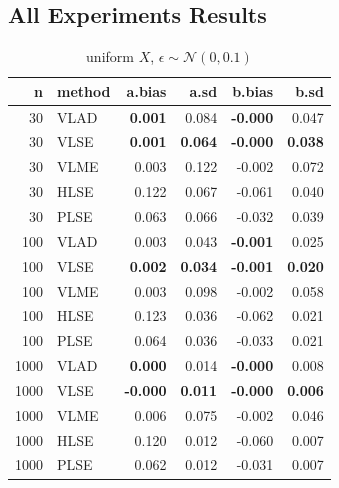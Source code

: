 \documentclass[twoside]{article}
\begin{document}
\subsection{All Experiments Results}
\label{append}

\begin{table}[ht]
\caption{uniform $X$, $\epsilon \sim \mathcal{N}(0,0.1)$}
\centering
\begin{tabular}{rlrrrr}
  \hline
  n & method & a.bias & a.sd & b.bias & b.sd \\ 
  \hline
  30 & VLAD & \textbf{0.001} & 0.084 & \textbf{-0.000} & 0.047 \\ 
  30 & VLSE & \textbf{0.001} & \textbf{0.064} & \textbf{-0.000} & \textbf{0.038} \\ 
  30 & VLME & 0.003 & 0.122 & -0.002 & 0.072 \\ 
  30 & HLSE & 0.122 & 0.067 & -0.061 & 0.040 \\ 
  30 & PLSE & 0.063 & 0.066 & -0.032 & 0.039 \\ 
  \hline
  100 & VLAD & 0.003 & 0.043 & \textbf{-0.001} & 0.025 \\ 
  100 & VLSE & \textbf{0.002} & \textbf{0.034} & \textbf{-0.001} & \textbf{0.020} \\ 
  100 & VLME & 0.003 & 0.098 & -0.002 & 0.058 \\ 
  100 & HLSE & 0.123 & 0.036 & -0.062 & 0.021 \\ 
  100 & PLSE & 0.064 & 0.036 & -0.033 & 0.021 \\ 
   \hline
  1000 & VLAD & \textbf{0.000} & 0.014 & \textbf{-0.000} & 0.008 \\ 
  1000 & VLSE & \textbf{-0.000} & \textbf{0.011} & \textbf{-0.000} & \textbf{0.006} \\ 
  1000 & VLME & 0.006 & 0.075 & -0.002 & 0.046 \\ 
  1000 & HLSE & 0.120 & 0.012 & -0.060 & 0.007 \\ 
  1000 & PLSE & 0.062 & 0.012 & -0.031 & 0.007 \\ 
   \hline
\end{tabular}
\end{table}
\end{document}
